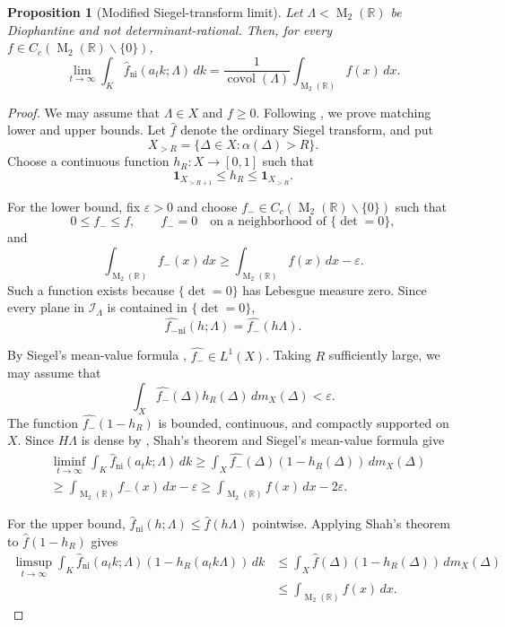 \documentclass[reqno,11pt]{amsart}
\newtheorem{prop}[prop]{Proposition}
\theoremstyle{definition}
\theoremstyle{remark}
\numberwithin{equation}{section}
\newcommand{\M}{\operatorname{M}}
\newcommand{\covol}{\operatorname{covol}}
\begin{document}
\begin{prop}[Modified Siegel-transform limit]
\label{prop:modified-siegel-limit-d2}
Let $\Lambda<\M_2(\mathbb R)$ be Diophantine and not
determinant-rational. Then, for every
$f\in C_c(\M_2(\mathbb R)\smallsetminus\{0\})$,
\[
\lim_{t\to\infty}
\int_K
\widehat f_{\operatorname{ni}}(a_tk;\Lambda)\,dk
=
\frac{1}{\covol(\Lambda)}
\int_{\M_2(\mathbb R)}f(x)\,dx.
\]
\end{prop}
\begin{proof} We may assume that $\Lambda\in X$ and $f\ge0$. Following
\cite[Section~7]{Kim}, we prove matching lower and upper bounds. Let
$\widehat f$ denote the ordinary Siegel transform, and put
\[
X_{>R}=\{\Delta\in X:\alpha(\Delta)>R\}.
\]
Choose a continuous function $h_R:X\to[0,1]$ such that
\[
\mathbf 1_{X_{>R+1}}\le h_R\le\mathbf 1_{X_{>R}}.
\]

For the lower bound, fix $\varepsilon>0$ and choose
$f_-\in C_c(\M_2(\mathbb R)\smallsetminus\{0\})$ such that
\[
0\le f_-\le f,\qquad
f_-=0\quad\text{on a neighborhood of }\{\det=0\},
\]
and
\[
\int_{\M_2(\mathbb R)}f_-(x)\,dx
\ge
\int_{\M_2(\mathbb R)}f(x)\,dx-\varepsilon.
\]
Such a function exists because $\{\det=0\}$ has Lebesgue measure zero.
Since every plane in $\mathcal I_\Lambda$ is contained in $\{\det=0\}$,
\[
\widehat{f_-}_{\operatorname{ni}}(h;\Lambda)
=
\widehat{f_-}(h\Lambda).
\]

By Siegel's mean-value formula \cite{siegel1945mean},
$\widehat{f_-}\in L^1(X)$. Taking $R$ sufficiently large, we may assume
that
\[
\int_X\widehat{f_-}(\Delta)h_R(\Delta)\,dm_X(\Delta)<\varepsilon.
\]
The function $\widehat{f_-}(1-h_R)$ is bounded, continuous, and compactly
supported on $X$. Since $H\Lambda$ is dense by
, Shah's theorem and Siegel's mean-value
formula give
\[
\begin{aligned}
&\liminf_{t\to\infty}
\int_K\widehat f_{\operatorname{ni}}(a_tk;\Lambda)\,dk
\ge
\int_X\widehat{f_-}(\Delta)(1-h_R(\Delta))\,dm_X(\Delta)\\
&\ge
\int_{\M_2(\mathbb R)}f_-(x)\,dx-\varepsilon\ge 
\int_{\M_2(\mathbb R)}f(x)\,dx-2\varepsilon.
\end{aligned}
\]

For the upper bound, $\widehat f_{\operatorname{ni}}(h;\Lambda)\le
\widehat f(h\Lambda)$ pointwise. Applying Shah's theorem to
$\widehat f(1-h_R)$ gives
\[
\begin{aligned}
\limsup_{t\to\infty}
\int_K
\widehat f_{\operatorname{ni}}(a_tk;\Lambda)
(1-h_R(a_tk\Lambda))\,dk
&\le
\int_X\widehat f(\Delta)(1-h_R(\Delta))\,dm_X(\Delta)\\
&\le
\int_{\M_2(\mathbb R)}f(x)\,dx.
\end{aligned}
\]


\end{proof}
\end{document}
